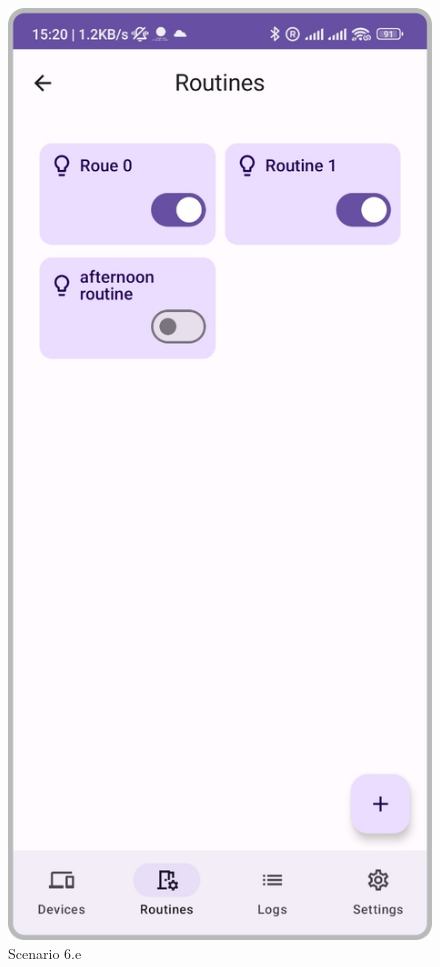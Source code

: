 \begin{enumerate}
\begin{enumerate}
    \begin{figure}
        \centering
        \includegraphics[width=0.5\linewidth]{imgs//usercase/scenario6-c.png}
        \caption{Scenario 6.e}
        \label{fig:enter-label}
    \end{figure}
    \end{enumerate}
\end{enumerate}